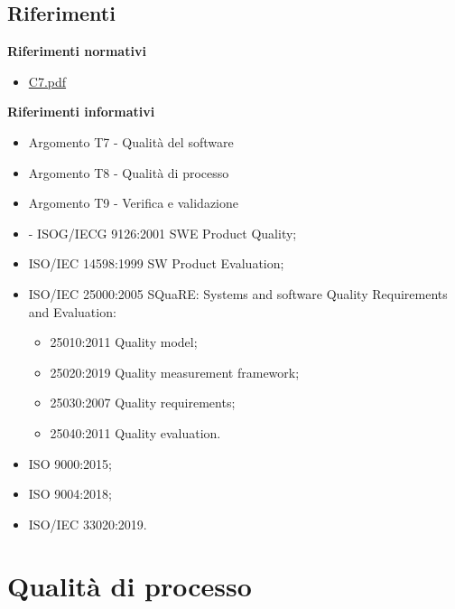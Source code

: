 \documentclass{article}
\begin{document}
{\subsection{Riferimenti}
\textbf{Riferimenti normativi}
\begin{itemize}
    \item \href{https://www.math.unipd.it/~tullio/IS-1/2023/Progetto/C7.pdf}{C7.pdf}
\end{itemize}
\textbf{Riferimenti informativi}
\begin{itemize}
    \item Argomento T7 - Qualità del software
    \item Argomento T8 - Qualità di processo
    \item Argomento T9 - Verifica e validazione
    \item - ISOG/IECG 9126:2001 SWE Product Quality;
    \item ISO/IEC 14598:1999 SW Product Evaluation;
    \item  ISO/IEC 25000:2005 SQuaRE: Systems and software Quality Requirements and Evaluation:
        \begin{itemize}
        \item 25010:2011 Quality model;
        \item 25020:2019 Quality measurement framework;
        \item 25030:2007 Quality requirements;
        \item 25040:2011 Quality evaluation.
    \end{itemize}
    \item ISO 9000:2015;
    \item ISO 9004:2018;
    \item ISO/IEC 33020:2019.
\end{itemize}

\section{Qualità di processo}
}
\end{document}
